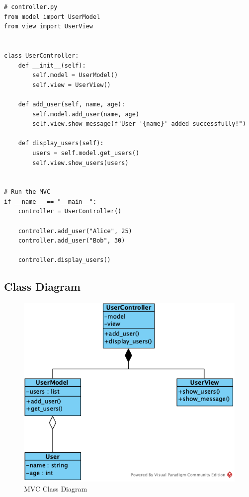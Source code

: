 \begin{lstlisting}[caption=controller.py]
# controller.py
from model import UserModel
from view import UserView


class UserController:
    def __init__(self):
        self.model = UserModel()
        self.view = UserView()

    def add_user(self, name, age):
        self.model.add_user(name, age)
        self.view.show_message(f"User '{name}' added successfully!")

    def display_users(self):
        users = self.model.get_users()
        self.view.show_users(users)


# Run the MVC
if __name__ == "__main__":
    controller = UserController()

    controller.add_user("Alice", 25)
    controller.add_user("Bob", 30)

    controller.display_users()

\end{lstlisting}

\subsection{Class Diagram}
\begin{figure}[H]
    \centering
    \includegraphics[scale=0.8]{Book-SSW565/jpg/ArchitecturePatterns/MVC Class Diagram.png}
    \caption{\label{Figure::MVC Class Diagram}MVC Class Diagram}
\end{figure}

